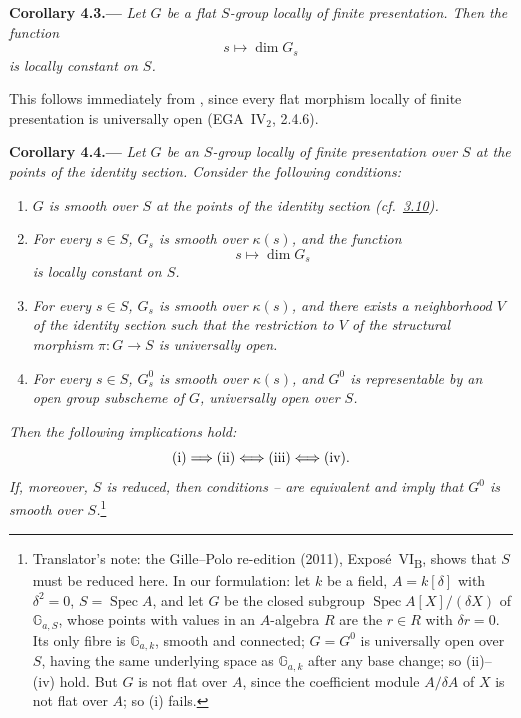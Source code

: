 
\medskip
{}\label{cor:sga3-VIB-4.3}%
\noindent\textbf{Corollary 4.3.---}
\emph{Let \(G\) be a flat \(S\)-group locally of finite
presentation. Then the function}
\[
  s\longmapsto\dim G_s
\]
\emph{is locally constant on \(S\).}

This follows immediately from , since every flat morphism
locally of finite presentation is universally open
(EGA~IV\(_2\), 2.4.6).

\medskip
{}\label{cor:sga3-VIB-4.4}%
\noindent\textbf{Corollary 4.4.---}
\emph{Let \(G\) be an \(S\)-group locally of finite presentation
over \(S\) at the points of the identity section. Consider the
following conditions:}
\begin{enumerate}
\item[\textup{\SGAInlineRefTarget{cor:sga3-VIB-4.4:item:i}(i)}] \emph{\(G\) is smooth over \(S\) at the points
  of the identity section \textup{(cf.\ \hyperref[thm:sga3-VIB-3.10]{3.10})}.}
\item[\textup{\SGAInlineRefTarget{cor:sga3-VIB-4.4:item:ii}(ii)}]\label{cond:sga3-VIB-4.4-ii} \emph{For every \(s\in S\), \(G_s\) is smooth
  over \(\kappa(s)\), and the function}
  \[
    s\longmapsto\dim G_s
  \]
  \emph{is locally constant on \(S\).}
\item[\textup{(iii)}] \emph{For every \(s\in S\), \(G_s\) is smooth
  over \(\kappa(s)\), and there exists a neighborhood \(V\) of the
  identity section such that the restriction to \(V\) of the
  structural morphism \(\pi:G\to S\) is universally open.}
\item[\textup{\SGAInlineRefTarget{cor:sga3-VIB-4.4:item:iv}(iv)}] \emph{For every \(s\in S\), \(G_s^0\) is
  smooth over \(\kappa(s)\), and \(G^0\) is representable by an
  open group subscheme of \(G\), universally open over \(S\).}
\end{enumerate}
\emph{Then the following implications hold:}
\[
  \textup{(i)}\Longrightarrow\textup{(ii)}
  \Longleftrightarrow\textup{(iii)}
  \Longleftrightarrow\textup{(iv)}.
\]
\emph{If, moreover, \(S\) is reduced, then conditions
\textup{}--\textup{} are equivalent and imply that \(G^0\)
is smooth over \(S\).}\footnote{Translator's note: the Gille--Polo re-edition (2011),
Expos\'e~VI\textsubscript{B}, shows that \(S\) must be reduced here. In our formulation: let \(k\) be a
field, \(A=k[\delta]\) with \(\delta^2=0\), \(S=\operatorname{Spec}A\), and let \(G\) be the closed subgroup
\(\operatorname{Spec}A[X]/(\delta X)\) of \(\mathbb G_{a,S}\), whose points with values in an \(A\)-algebra
\(R\) are the \(r\in R\) with \(\delta r=0\). Its only fibre is \(\mathbb G_{a,k}\), smooth and connected;
\(G=G^0\) is universally open over \(S\), having the same underlying space as \(\mathbb G_{a,k}\) after
any base change; so \textup{(ii)}--\textup{(iv)} hold. But \(G\) is not flat over \(A\), since the
coefficient module \(A/\delta A\) of \(X\) is not flat over \(A\); so \textup{(i)} fails.}

